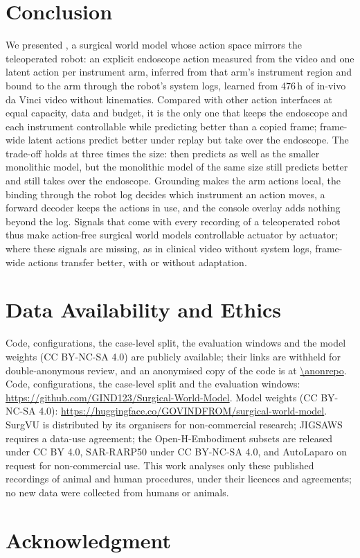 \section{Conclusion}
We presented \method{}, a surgical world model whose action space mirrors the teleoperated robot: an explicit endoscope action measured from the video and one latent action per instrument arm, inferred from that arm's instrument region and bound to the arm through the robot's system logs, learned from 476\,h of in-vivo da Vinci video without kinematics. Compared with other action interfaces at equal capacity, data and budget, it is the only one that keeps the endoscope and each instrument controllable while predicting better than a copied frame; frame-wide latent actions predict better under replay but take over the endoscope. The trade-off holds at three times the size: \method{} then predicts as well as the smaller monolithic model, but the monolithic model of the same size still predicts better and still takes over the endoscope. Grounding makes the arm actions local, the binding through the robot log decides which instrument an action moves, a forward decoder keeps the actions in use, and the console overlay adds nothing beyond the log. Signals that come with every recording of a teleoperated robot thus make action-free surgical world models controllable actuator by actuator; where these signals are missing, as in clinical video without system logs, frame-wide actions transfer better, with or without adaptation.

\section*{Data Availability and Ethics}
\ifreview
Code, configurations, the case-level split, the evaluation windows and the model weights (CC BY-NC-SA 4.0) are publicly available; their links are withheld for double-anonymous review\ifx\anonrepo\empty\else, and an anonymised copy of the code is at \expandafter\url\expandafter{\anonrepo}\fi.
\else
Code, configurations, the case-level split and the evaluation windows: \url{https://github.com/GIND123/Surgical-World-Model}. Model weights (CC BY-NC-SA 4.0): \url{https://huggingface.co/GOVINDFROM/surgical-world-model}.
\fi
SurgVU \cite{surgvu} is distributed by its organisers for non-commercial research; JIGSAWS \cite{jigsaws} requires a data-use agreement; the Open-H-Embodiment subsets \cite{openh} are released under CC BY 4.0, SAR-RARP50 \cite{sarrarp} under CC BY-NC-SA 4.0, and AutoLaparo \cite{autolaparo} on request for non-commercial use. This work analyses only these published recordings of animal and human procedures, under their licences and agreements; no new data were collected from humans or animals.

\ifreview\else
\section*{Acknowledgment}
\fi
